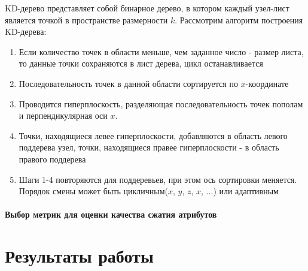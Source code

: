 KD-дерево представляет собой бинарное дерево, в котором каждый узел-лист
является точкой в пространстве размерности $k$. Рассмотрим алгоритм построения
KD-дерева:

\begin{enumerate}
    \item Если количество точек в области меньше, чем заданное число - размер
    листа, то данные точки сохраняются в лист дерева, цикл останавливается
    \item Последовательность точек в данной области сортируется по
    $x$-координате
    \item Проводится гиперплоскость, разделяющая последовательность точек
    пополам и перпендикулярная оси $x$.
    \item Точки, находящиеся левее гиперплоскости, добавляются в область левого
    поддерева узел, точки, находящиеся правее гиперплоскости - в область правого
    поддерева
    \item Шаги 1-4 повторяются для поддеревьев, при этом ось сортировки
    меняется. Порядок смены может быть цикличным($x$, $y$, $z$, $x$, $\dots$)
    или адаптивным
\end{enumerate}


\subsubsection{Выбор метрик для оценки качества сжатия атрибутов}


\chapter{Результаты работы}



